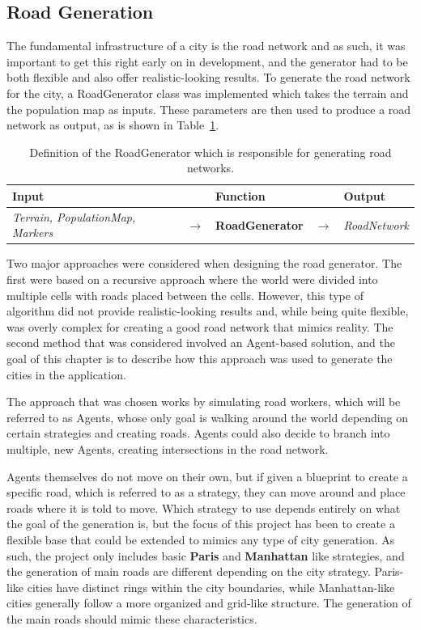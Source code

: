 \subsection{Road Generation}
The fundamental infrastructure of a city is the road network and as such, it was important to get this right early on in development, and the generator had to be both flexible and also offer realistic-looking results.
To generate the road network for the city, a RoadGenerator class was implemented which takes the terrain and the population map as inputs.
These parameters are then used to produce a road network as output, as is shown in Table~\ref{table:def_roadgen}.

\begin{table}[H]
  \centering
  \begin{tabular}{lllll}
    \textbf{Input} & & \textbf{Function} & & \textbf{Output} \\
    \midrule
    \textit{Terrain, PopulationMap, Markers} & $\rightarrow$ & \textbf{RoadGenerator} & $\rightarrow$ & \textit{RoadNetwork} \\
    \bottomrule
  \end{tabular}

  \caption{Definition of the RoadGenerator which is responsible for generating road networks.}
  \label{table:def_roadgen}
\end{table}
\vspace{-0.4cm}

Two major approaches were considered when designing the road generator.
The first were based on a recursive approach where the world were divided into multiple cells with roads placed between the cells.
However, this type of algorithm did not provide realistic-looking results and, while being quite flexible, was overly complex for creating a good road network that mimics reality.
The second method that was considered involved an Agent-based solution, and the goal of this chapter is to describe how this approach was used to generate the cities in the application.

The approach that was chosen works by simulating road workers, which will be referred to as Agents, whose only goal is walking around the world depending on certain strategies and creating roads.
Agents could also decide to branch into multiple, new Agents, creating intersections in the road network.

Agents themselves do not move on their own, but if given a blueprint to create a specific road, which is referred to as a strategy, they can move around and place roads where it is told to move.
Which strategy to use depends entirely on what the goal of the generation is, but the focus of this project has been to create a flexible base that could be extended to mimics any type of city generation.
As such, the project only includes basic \textbf{Paris} and \textbf{Manhattan} like strategies, and the generation of main roads are different depending on the city strategy.
Paris-like cities have distinct rings within the city boundaries, while Manhattan-like cities generally follow a more organized and grid-like structure.
The generation of the main roads should mimic these characteristics.

